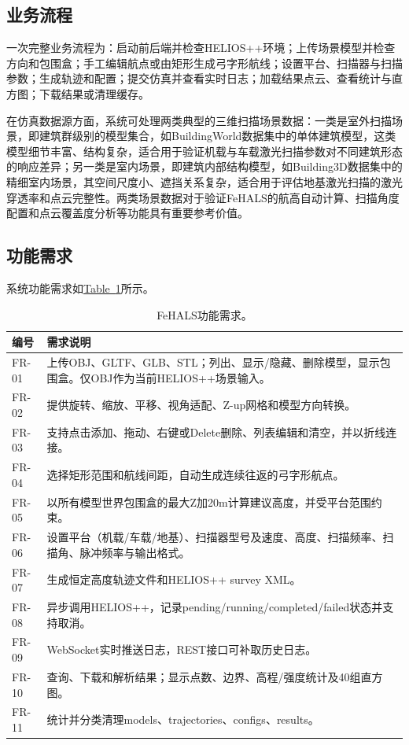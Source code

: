 \documentclass[a4paper,fleqn]{cas-sc}
\newcommand{\refTab}[1]{\hyperref[#1]{Table~\ref*{#1}}}
\begin{document}
\subsection{业务流程}

一次完整业务流程为：启动前后端并检查HELIOS++环境；上传场景模型并检查方向和包围盒；手工编辑航点或由矩形生成弓字形航线；设置平台、扫描器与扫描参数；生成轨迹和配置；提交仿真并查看实时日志；加载结果点云、查看统计与直方图；下载结果或清理缓存。

在仿真数据源方面，系统可处理两类典型的三维扫描场景数据：一类是室外扫描场景，即建筑群级别的模型集合，如BuildingWorld数据集中的单体建筑模型，这类模型细节丰富、结构复杂，适合用于验证机载与车载激光扫描参数对不同建筑形态的响应差异；另一类是室内场景，即建筑内部结构模型，如Building3D数据集中的精细室内场景，其空间尺度小、遮挡关系复杂，适合用于评估地基激光扫描的激光穿透率和点云完整性。两类场景数据对于验证FeHALS的航高自动计算、扫描角度配置和点云覆盖度分析等功能具有重要参考价值。

\subsection{功能需求}

系统功能需求如\refTab{tab:functions}所示。

\begin{table}[pos=!htbp]
    \centering
    \caption{FeHALS功能需求。}
    \begin{tabular*}{\textwidth}{@{\extracolsep{\fill}} l l}
        \toprule
        编号 & 需求说明 \\
        \midrule
        FR-01 & 上传OBJ、GLTF、GLB、STL；列出、显示/隐藏、删除模型，显示包围盒。仅OBJ作为当前HELIOS++场景输入。 \\
        FR-02 & 提供旋转、缩放、平移、视角适配、Z-up网格和模型方向转换。 \\
        FR-03 & 支持点击添加、拖动、右键或Delete删除、列表编辑和清空，并以折线连接。 \\
        FR-04 & 选择矩形范围和航线间距，自动生成连续往返的弓字形航点。 \\
        FR-05 & 以所有模型世界包围盒的最大Z加20m计算建议高度，并受平台范围约束。 \\
        FR-06 & 设置平台（机载/车载/地基）、扫描器型号及速度、高度、扫描频率、扫描角、脉冲频率与输出格式。 \\
        FR-07 & 生成恒定高度轨迹文件和HELIOS++ survey XML。 \\
        FR-08 & 异步调用HELIOS++，记录pending/running/completed/failed状态并支持取消。 \\
        FR-09 & WebSocket实时推送日志，REST接口可补取历史日志。 \\
        FR-10 & 查询、下载和解析结果；显示点数、边界、高程/强度统计及40组直方图。 \\
        FR-11 & 统计并分类清理models、trajectories、configs、results。 \\
        \bottomrule
    \end{tabular*}
    \label{tab:functions}
\end{table}
\end{document}
